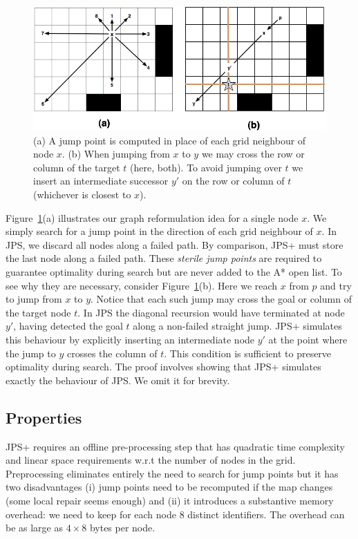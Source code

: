 \begin{figure}[tb]
       \begin{center}
		   \includegraphics[width=0.95\columnwidth]
			{diagrams/preproc.png}
       \end{center}
	\vspace{-3pt}
       \caption{(a) A jump point is computed in place of each grid neighbour of node $x$.
		(b) When jumping from $x$ to $y$ we may cross the row or column of the target $t$ (here, both). 
To avoid jumping over $t$ we insert an intermediate successor $y'$ on the row or column of $t$ (whichever is closest to $x$).}

       \label{fig:preproc}
\end{figure}

Figure~\ref{fig:preproc}(a) illustrates our graph reformulation idea for a 
single node $x$. We simply search for a jump point in the direction
of each grid neighbour of $x$. In JPS, we discard all nodes along a failed
path. By comparison, JPS+ must store the last node along a failed path.
These \emph{sterile jump points} are required 
to guarantee optimality during search but are never added to the A* open list.
To see why they are necessary, consider Figure~\ref{fig:preproc}(b).
Here we reach $x$ from $p$ and try to jump from $x$ to $y$. 
Notice that each such jump may cross the goal or column of the target node
$t$. In JPS the diagonal recursion would have terminated at node $y'$, having detected
the goal $t$ along a non-failed straight jump.
JPS+ simulates this behaviour by explicitly inserting an intermediate node $y'$ 
at the point where the jump to $y$ crosses the column of $t$.
This condition is sufficient to preserve optimality during search. The proof
involves showing that JPS+ simulates exactly the behaviour of JPS. We omit it 
for brevity.

\subsection{Properties}
JPS+ requires an offline pre-processing step that has quadratic time complexity
and linear space requirements w.r.t the number of nodes in the grid.
Preprocessing eliminates entirely the need to search for jump
points but it has two disadvantages (i) jump points need to be recomputed
if the map changes (some local repair seems enough) and (ii) it introduces 
a substantive memory overhead: we need to keep for each node 8 distinct identifiers. 
The overhead can be as large as $4\times8$ bytes per node. 
